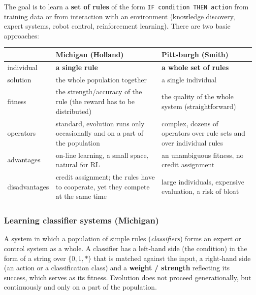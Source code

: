 \documentclass[11pt,a4paper]{article}
\theoremstyle{definition}
\begin{document}
The goal is to learn a \textbf{set of rules} of the form
\texttt{IF condition THEN action} from training data or from interaction with an
environment (knowledge discovery, expert systems, robot control, reinforcement
learning). There are two basic approaches:

\begin{center}
\begin{tabular}{@{}p{2.8cm}p{6.2cm}p{6.2cm}@{}}
\toprule
 & \textbf{Michigan} (Holland) & \textbf{Pittsburgh} (Smith) \\
\midrule
individual & \textbf{a single rule} & \textbf{a whole set of rules} \\
solution & the whole population together & a single individual \\
fitness & the strength/accuracy of the rule (the reward has to be distributed) &
  the quality of the whole system (straightforward) \\
operators & standard, evolution runs only occasionally and on a part of the
  population &
  complex, dozens of operators over rule sets and over individual rules \\
advantages & on-line learning, a small space, natural for RL & an unambiguous
  fitness, no credit assignment \\
disadvantages & credit assignment; the rules have to cooperate, yet they compete
  at the same time &
  large individuals, expensive evaluation, a risk of bloat \\
\bottomrule
\end{tabular}
\end{center}

\subsubsection{Learning classifier systems (Michigan)}

\begin{defbox}
A system in which a population of simple rules (\emph{classifiers}) forms an
expert or control system as a whole. A classifier has a left-hand side (the
condition) in the form of a string over $\{0,1,*\}$ that is matched against the
input, a right-hand side (an action or a classification class) and a
\textbf{weight / strength} reflecting its success, which serves as its fitness.
Evolution does not proceed generationally, but continuously and only on a part
of the population.
\end{defbox}
\end{document}
